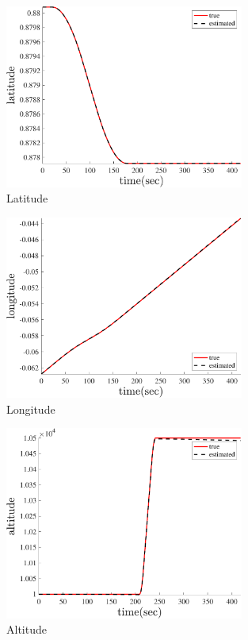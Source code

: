     \begin{figure}[H]
        \centering
        \includegraphics[width=0.7\textwidth]{../Figure/Q5/latitude_q}
        \caption{Latitude}
    \end{figure}
    \begin{figure}[H]
        \centering
        \includegraphics[width=0.7\textwidth]{../Figure/Q5/longitude_q}
        \caption{Longitude}
    \end{figure}
    \begin{figure}[H]
        \centering
        \includegraphics[width=0.7\textwidth]{../Figure/Q5/altitude_q}
        \caption{Altitude}
    \end{figure}
